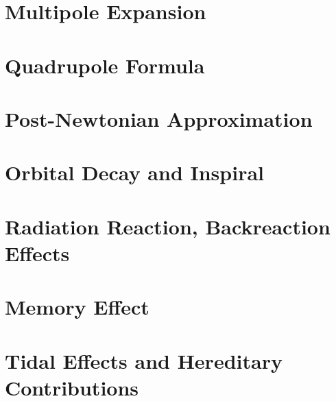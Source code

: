\section{Multipole Expansion}\label{sec:multipole-expansion}
\section{Quadrupole Formula}\label{sec:quadrupole-formula}
\section{Post-Newtonian Approximation}\label{sec:post-newtonian-approximation}
\section{Orbital Decay and Inspiral}\label{sec:orbital-decay-and-inspiral}
\section{Radiation Reaction, Backreaction Effects}\label{sec:radiation-reaction-backreaction-effects}
\section{Memory Effect}\label{sec:memory-effect}
\section{Tidal Effects and Hereditary Contributions}\label{sec:tidal-effects-and-hereditary-contributions}